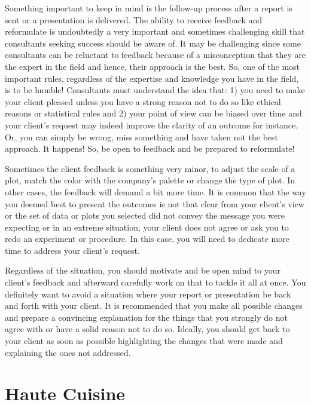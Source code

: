 \documentclass[
]{book}
\begin{document}
Something important to keep in mind is the follow-up process after a report is sent or a presentation is delivered. The ability to receive feedback and reformulate is undoubtedly a very important and sometimes challenging skill that consultants seeking success should be aware of. It may be challenging since some consultants can be reluctant to feedback because of a misconception that they are the expert in the field and hence, their approach is the best. So, one of the most important rules, regardless of the expertise and knowledge you have in the field, is to be humble! Consultants must understand the idea that: 1) you need to make your client pleased unless you have a strong reason not to do so like ethical reasons or statistical rules and 2) your point of view can be biased over time and your client's request may indeed improve the clarity of an outcome for instance. Or, you can simply be wrong, miss something and have taken not the best approach. It happens! So, be open to feedback and be prepared to reformulate!

Sometimes the client feedback is something very minor, to adjust the scale of a plot, match the color with the company's palette or change the type of plot. In other cases, the feedback will demand a bit more time. It is common that the way you deemed best to present the outcomes is not that clear from your client's view or the set of data or plots you selected did not convey the message you were expecting or in an extreme situation, your client does not agree or ask you to redo an experiment or procedure. In this case, you will need to dedicate more time to address your client's request.

Regardless of the situation, you should motivate and be open mind to your client's feedback and afterward carefully work on that to tackle it all at once. You definitely want to avoid a situation where your report or presentation be back and forth with your client. It is recommended that you make all possible changes and prepare a convincing explanation for the things that you strongly do not agree with or have a solid reason not to do so. Ideally, you should get back to your client as soon as possible highlighting the changes that were made and explaining the ones not addressed.

\hypertarget{part-haute-cuisine}{%
\part*{Haute Cuisine}\label{part-haute-cuisine}}
\end{document}
